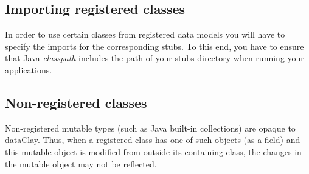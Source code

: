 % 


\subsection{Importing registered classes}
\label{sec:JavaImports}

In order to use certain classes from registered data models you will have to specify the imports for the corresponding stubs. To this end, you have to ensure that Java \textit{classpath} includes the path of your stubs directory when running your applications.

\subsection{Non-registered classes}
Non-registered mutable types (such as Java built-in collections) are opaque to dataClay. Thus, when a registered class has one of such objects (as a field) and this mutable object is modified from outside its containing class, the changes in the mutable object may not be reflected.

